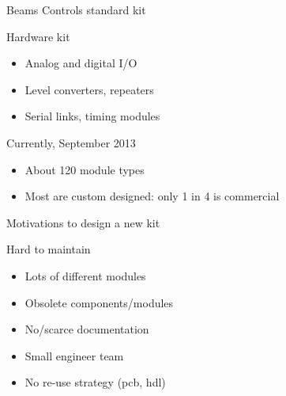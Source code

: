 \documentclass[compress,red]{beamer}
\begin{document}
\begin{frame}{Beams Controls standard kit}

  \begin{block}{Hardware kit}
    \begin{itemize}
    \item Analog and digital I/O
    \item Level converters, repeaters
    \item Serial links, timing modules
    \end{itemize}
  \end{block}

  \begin{block}{Currently, September 2013}
    \begin{itemize}
    \item About 120 module types %
    \item Most are custom designed: only 1 in 4 is commercial
    \end{itemize}
  \end{block}

\end{frame}

\begin{frame}{Motivations to design a new kit}


  \begin{block}{Hard to maintain}
    \begin{itemize}
    \item Lots of different modules
    \item Obsolete components/modules
    \item No/scarce documentation
    \item Small engineer team
    \item No re-use strategy (pcb, hdl)
    \end{itemize}
  \end{block}

\end{frame}
\end{document}
